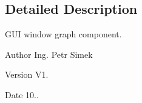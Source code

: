 \subsection{Detailed Description}
G\+UI window graph component. 

\begin{DoxyAuthor}{Author}
Ing. Petr Simek 
\end{DoxyAuthor}
\begin{DoxyVersion}{Version}
V1. 
\end{DoxyVersion}
\begin{DoxyDate}{Date}
10.. 
\end{DoxyDate}
